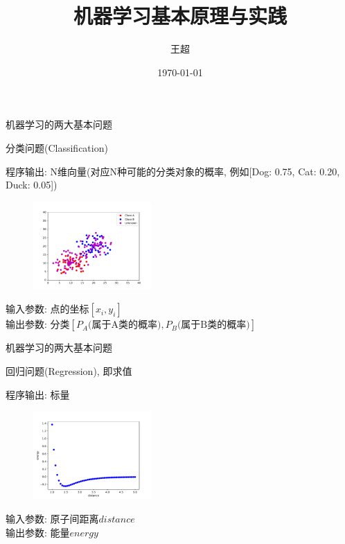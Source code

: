 \documentclass{beamer}
\title{机器学习基本原理与实践}
\author{王超}
\institute{}
\date{\today}
\begin{document}
\frame{\titlepage}


\begin{frame} {机器学习的两大基本问题} 

\begin{block}{分类问题(Classification)}
    {
    程序输出: N维向量(对应N种可能的分类对象的概率, 例如[Dog: 0.75, Cat: 0.20, Duck: 0.05])
    \begin{figure}
    \begin{center}
    \includegraphics[width=0.4\textwidth]{fig/classification.pdf}
    \end{center}
    \end{figure}
    输入参数: 点的坐标${[x_i, y_i]}$ \\
    输出参数: 分类${[P_A\mbox{(属于A类的概率)}, P_B\mbox{(属于B类的概率)}]}$
    }
\end{block}

\end{frame}



\begin{frame} {机器学习的两大基本问题} 

\begin{block}{回归问题(Regression), 即求值}
    {
    程序输出: 标量
    \begin{figure}
    \begin{center}
    \includegraphics[width=0.4\textwidth]{fig/regression.pdf}
    \end{center}
    \end{figure}
    输入参数: 原子间距离$distance$ \\
    输出参数: 能量$energy$
    }
\end{block}

\end{frame}
\end{document}
